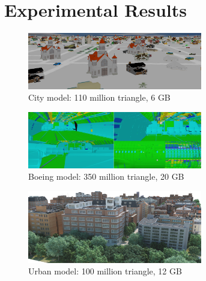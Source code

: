 
\section{Experimental Results}

\begin{figure}[ht]
  \centering
  \includegraphics[width=3.0in]{city.png}
  \caption{City model: 110 million triangle, 6 GB }
  \label{fig:model1}
\end{figure}

\begin{figure}[ht]
  \centering
  \includegraphics[width=3.0in]{boeing.jpg}
  \caption{Boeing model: 350 million triangle, 20 GB }
  \label{fig:model2}
\end{figure}

\begin{figure}[ht]
  \centering
  \includegraphics[width=3.0in]{densecity.jpg}
  \caption{Urban model: 100 million triangle, 12 GB }
  \label{fig:model3}
\end{figure}


